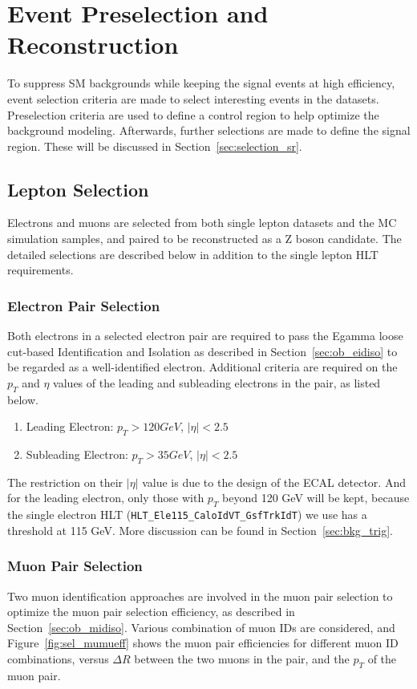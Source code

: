 \section{Event Preselection and Reconstruction}
To suppress SM backgrounds while keeping the signal events at high efficiency, event selection criteria are made to select interesting events in the datasets. Preselection criteria are used to define a control region to help optimize the background modeling. Afterwards, further selections are made to define the signal region. These will be discussed in Section~\ref{sec:selection_sr}.

\subsection{Lepton Selection}
Electrons and muons are selected from both single lepton datasets and the MC simulation samples, and paired to be reconstructed as a Z boson candidate. The detailed selections are described below in addition to the single lepton HLT requirements.
\subsubsection{Electron Pair Selection}
Both electrons in a selected electron pair are required to pass the Egamma loose cut-based Identification and Isolation as described in Section~\ref{sec:ob_eidiso} to be regarded as a well-identified electron. Additional criteria are required on the $p_T$ and $\eta$ values of the leading and subleading electrons in the pair, as listed below.
\begin{enumerate}
\item Leading Electron: $p_T >120 GeV$, $|\eta|<2.5$
\item Subleading Electron: $p_T >35 GeV$, $|\eta|<2.5$
\end{enumerate}

The restriction on their $|\eta|$ value is due to the design of the ECAL detector. And for the leading electron, only those with $p_T$ beyond 120 GeV will be kept, because the single electron HLT (\texttt{HLT\_Ele115\_CaloIdVT\_GsfTrkIdT}) we use has a threshold at 115 GeV. More discussion can be found in Section~\ref{sec:bkg_trig}.

\subsubsection{Muon Pair Selection}\label{sec:muonselection}
Two muon identification approaches are involved in the muon pair selection to optimize the muon pair selection efficiency, as described in Section~\ref{sec:ob_midiso}. Various combination of muon IDs are considered, and Figure~\ref{fig:sel_mumueff} shows the muon pair efficiencies for different muon ID combinations, versus $\Delta R$ between the two muons in the pair, and the $p_T$ of the muon pair.

